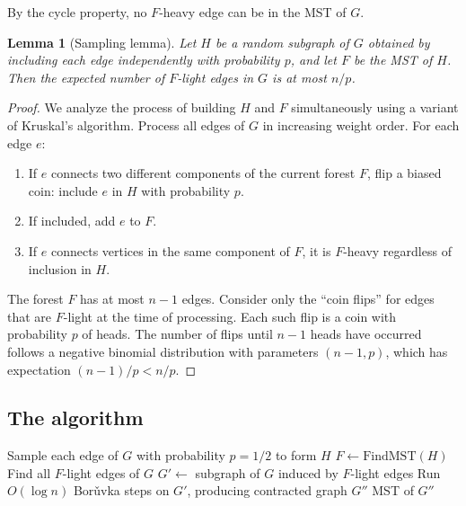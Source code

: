 \documentclass[twoside,12pt]{book}
\theoremstyle{plain}
\newtheorem{lemma}[theorem]{Lemma}
\theoremstyle{definition}
\theoremstyle{remark}
\begin{document}
By the cycle property, no $F$-heavy edge can be in the MST of $G$.

\begin{lemma}[Sampling lemma]
\label{lem:sampling}
Let $H$ be a random subgraph of $G$ obtained by including each edge independently with probability $p$, and let $F$ be the MST of $H$. Then the expected number of $F$-light edges in $G$ is at most $n/p$.
\end{lemma}

\begin{proof}
We analyze the process of building $H$ and $F$ simultaneously using a variant of Kruskal's algorithm. Process all edges of $G$ in increasing weight order. For each edge $e$:
\begin{enumerate}[nosep]
    \item If $e$ connects two different components of the current forest $F$, flip a biased coin: include $e$ in $H$ with probability $p$.
    \item If included, add $e$ to $F$.
    \item If $e$ connects vertices in the same component of $F$, it is $F$-heavy regardless of inclusion in $H$.
\end{enumerate}

The forest $F$ has at most $n - 1$ edges. Consider only the ``coin flips'' for edges that are $F$-light at the time of processing. Each such flip is a coin with probability $p$ of heads. The number of flips until $n - 1$ heads have occurred follows a negative binomial distribution with parameters $(n-1, p)$, which has expectation $(n-1)/p < n/p$.
\end{proof}

\subsection{The algorithm}

\begin{algorithm}
\caption{Karger--Klein--Tarjan MST Algorithm}
\label{alg:kkt}
\begin{algorithmic}[1]
    \State Sample each edge of $G$ with probability $p = 1/2$ to form $H$
    \State $F \gets \text{FindMST}(H)$ 
    \State Find all $F$-light edges of $G$ 
    \State $G' \gets$ subgraph of $G$ induced by $F$-light edges
    \State Run $O(\log n)$ Bor\v{u}vka steps on $G'$, producing contracted graph $G''$
    \State \Return MST of $G''$ 
\EndFunction
\end{algorithmic}
\end{algorithm}
\end{document}
